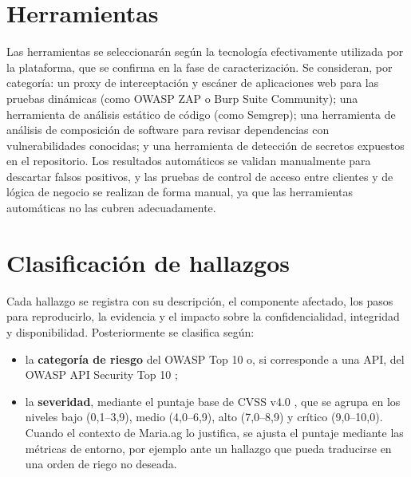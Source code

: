 \documentclass[12pt,letterpaper]{report}
\begin{document}
\section*{Herramientas}

Las herramientas se seleccionarán según la tecnología efectivamente utilizada
por la plataforma, que se confirma en la fase de caracterización. Se
consideran, por categoría: un proxy de interceptación y escáner de
aplicaciones web para las pruebas dinámicas (como OWASP ZAP o Burp Suite
Community); una herramienta de análisis estático de código (como Semgrep); una
herramienta de análisis de composición de software para revisar dependencias
con vulnerabilidades conocidas; y una herramienta de detección de secretos
expuestos en el repositorio. Los resultados automáticos se validan
manualmente para descartar falsos positivos, y las pruebas de control de
acceso entre clientes y de lógica de negocio se realizan de forma manual, ya
que las herramientas automáticas no las cubren adecuadamente.


\section*{Clasificación de hallazgos}

Cada hallazgo se registra con su descripción, el componente afectado, los pasos
para reproducirlo, la evidencia y el impacto sobre la confidencialidad,
integridad y disponibilidad. Posteriormente se clasifica según:

\begin{itemize}[leftmargin=1.25cm]
    \item la \textbf{categoría de riesgo} del OWASP Top 10
    \autocite{owasp2025top10} o, si corresponde a una API, del OWASP API
    Security Top 10 \autocite{owasp2023api};
    \item la \textbf{severidad}, mediante el puntaje base de CVSS v4.0
    \autocite{first2023cvss}, que se agrupa en los niveles bajo (0,1--3,9),
    medio (4,0--6,9), alto (7,0--8,9) y crítico (9,0--10,0). Cuando el
    contexto de Maria.ag lo justifica, se ajusta el puntaje mediante las
    métricas de entorno, por ejemplo ante un hallazgo que pueda traducirse en
    una orden de riego no deseada.
\end{itemize}
\end{document}
